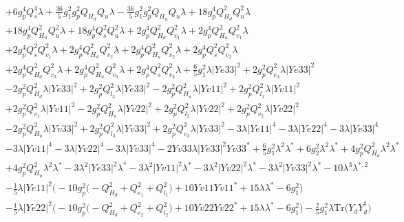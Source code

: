 \begin{align}
 &+6 g_{p}^{4} Q_{s}^{4} \lambda +\frac{36}{5} g_{1}^{2} g_{p}^{2} Q_{H_d} Q_{u} \lambda -\frac{36}{5} g_{1}^{2} g_{p}^{2} Q_{H_u} Q_{u} \lambda +18 g_{p}^{4} Q_{H_d}^{2} Q_{u}^{2} \lambda \nonumber \\ 
 &+18 g_{p}^{4} Q_{H_u}^{2} Q_{u}^{2} \lambda +18 g_{p}^{4} Q_{s}^{2} Q_{u}^{2} \lambda +2 g_{p}^{4} Q_{H_d}^{2} Q_{v_1}^{2} \lambda +2 g_{p}^{4} Q_{H_u}^{2} Q_{v_1}^{2} \lambda \nonumber \\ 
 &+2 g_{p}^{4} Q_{s}^{2} Q_{v_1}^{2} \lambda +2 g_{p}^{4} Q_{H_d}^{2} Q_{v_2}^{2} \lambda +2 g_{p}^{4} Q_{H_u}^{2} Q_{v_2}^{2} \lambda +2 g_{p}^{4} Q_{s}^{2} Q_{v_2}^{2} \lambda \nonumber \\ 
 &+2 g_{p}^{4} Q_{H_d}^{2} Q_{v_3}^{2} \lambda +2 g_{p}^{4} Q_{H_u}^{2} Q_{v_3}^{2} \lambda +2 g_{p}^{4} Q_{s}^{2} Q_{v_3}^{2} \lambda +\frac{6}{5} g_{1}^{2} \lambda |Ye33|^2 +2 g_{p}^{2} Q_{e_3}^{2} \lambda |Ye33|^2 \nonumber \\ 
 &-2 g_{p}^{2} Q_{H_d}^{2} \lambda |Ye33|^2 +2 g_{p}^{2} Q_{l_3}^{2} \lambda |Ye33|^2 -2 g_{p}^{2} Q_{H_u}^{2} \lambda |Yv11|^2 +2 g_{p}^{2} Q_{l_1}^{2} \lambda |Yv11|^2 \nonumber \\ 
 &+2 g_{p}^{2} Q_{v_1}^{2} \lambda |Yv11|^2 -2 g_{p}^{2} Q_{H_u}^{2} \lambda |Yv22|^2 +2 g_{p}^{2} Q_{l_2}^{2} \lambda |Yv22|^2 +2 g_{p}^{2} Q_{v_2}^{2} \lambda |Yv22|^2 \nonumber \\ 
 &-2 g_{p}^{2} Q_{H_u}^{2} \lambda |Yv33|^2 +2 g_{p}^{2} Q_{l_3}^{2} \lambda |Yv33|^2 +2 g_{p}^{2} Q_{v_3}^{2} \lambda |Yv33|^2 -3 \lambda |Ye11|^4 -3 \lambda |Ye22|^4 -3 \lambda |Ye33|^4 \nonumber \\ 
 &-3 \lambda |Yv11|^4 -3 \lambda |Yv22|^4 -3 \lambda |Yv33|^4 -2 Yv33 \lambda |Ye33|^2 Yv33^* +\frac{6}{5} g_{1}^{2} \lambda^{2} \lambda^* +6 g_{2}^{2} \lambda^{2} \lambda^* +4 g_{p}^{2} Q_{H_d}^{2} \lambda^{2} \lambda^* \nonumber \\ 
 &+4 g_{p}^{2} Q_{H_u}^{2} \lambda^{2} \lambda^* -3 \lambda^{2} |Ye33|^2 \lambda^* -3 \lambda^{2} |Yv11|^2 \lambda^* -3 \lambda^{2} |Yv22|^2 \lambda^* -3 \lambda^{2} |Yv33|^2 \lambda^* -10 \lambda^{3} \lambda^{*,2} \nonumber \\ 
 &-\frac{1}{5} \lambda |Ye11|^2 \Big(-10 g_{p}^{2} \Big(- Q_{H_d}^{2}  + Q_{e_{1}}^{2} + Q_{l_1}^{2}\Big) + 10 Yv11 Yv11^*  + 15 \lambda \lambda^*  -6 g_{1}^{2} \Big)\nonumber \\ 
 &-\frac{1}{5} \lambda |Ye22|^2 \Big(-10 g_{p}^{2} \Big(- Q_{H_d}^{2}  + Q_{e_{2}}^{2} + Q_{l_2}^{2}\Big) + 10 Yv22 Yv22^*  + 15 \lambda \lambda^*  -6 g_{1}^{2} \Big)-\frac{2}{5} g_{1}^{2} \lambda \mbox{Tr}\Big({Y_d  Y_{d}^{\dagger}}\Big) \nonumber \\ 

\end{align}
